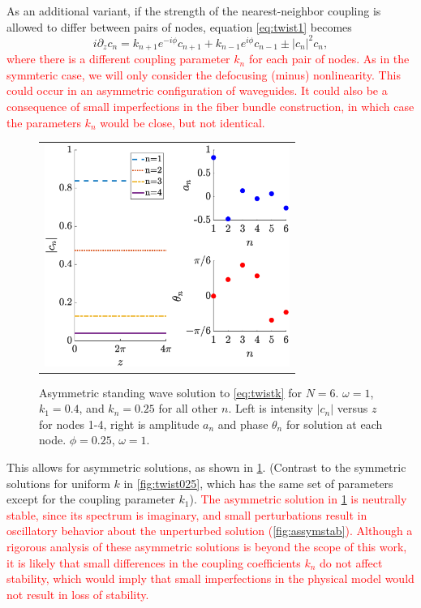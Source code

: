 \documentclass[reprint, amsmath,amssymb,aps,pra]{revtex4-2}
\def\noi{\noindent}
\renewcommand{\revised}[1]{ \textcolor{red}{#1} }
\begin{document}
As an additional variant, if the strength of the nearest-neighbor coupling is allowed to differ between pairs of nodes, equation \cref{eq:twist1} becomes
\begin{equation}\label{eq:twistk}
i \partial_z c_n = k_{n+1} e^{-i\phi}c_{n+1} + k_{n-1} e^{i\phi}c_{n-1} \pm |c_n|^2 c_n,
\end{equation}
\revised{where there is a different coupling parameter $k_n$ for each pair of nodes. As in the symmteric case, we will  only consider the defocusing (minus) nonlinearity. This could occur in an asymmetric configuration of waveguides. It could also be a consequence of small imperfections in the fiber bundle construction, in which case the parameters $k_n$ would be close, but not identical.}
\begin{figure}
\begin{center}
\begin{tabular}{c}
\includegraphics[width=8cm]{even6assym.eps}
\end{tabular}
\end{center}
\caption{Asymmetric standing wave solution to \cref{eq:twistk} for $N = 6$. $\omega = 1$, $k_1 = 0.4$, and $k_n = 0.25$ for all other $n$. Left is intensity $|c_n|$ versus $z$ for nodes 1-4, right is amplitude $a_n$ and phase $\theta_n$ for solution at each node. $\phi = 0.25$, $\omega = 1$.}
\label{fig:even6assym}
\end{figure}
\noi This allows for asymmetric solutions, as shown in \cref{fig:even6assym}. (Contrast to the symmetric solutions for uniform $k$ in \cref{fig:twist025}, which has the same set of parameters except for the coupling parameter $k_1$). \revised{The asymmetric solution in \cref{fig:even6assym} is neutrally stable, since its spectrum is imaginary, and small perturbations result in oscillatory behavior about the unperturbed solution (\cref{fig:assymstab}). Although a rigorous analysis of these asymmetric solutions is beyond the scope of this work, it is likely that small differences in the coupling coefficients $k_n$ do not affect stability, which would imply that small imperfections in the physical model would not result in loss of stability.}
\end{document}
